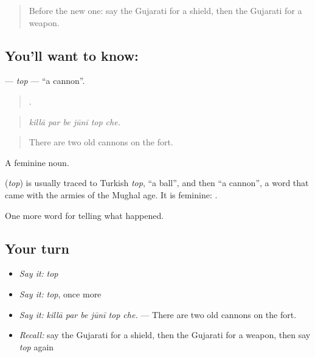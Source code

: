 \label{lesson:GU-C321-top}



\begin{quote}
Before the new one: say the Gujarati for a shield, then the Gujarati for a weapon.
\end{quote}

\subsection*{You'll want to know: }
\textbf{} — \emph{top} — \textquotedblleft{}a cannon\textquotedblright{}.

\begin{quote}
     .
\end{quote}

\begin{quote}
\emph{killā par be jūnī top che.}
\end{quote}

\begin{quote}
There are two old cannons on the fort.
\end{quote}

A feminine noun.

\begin{cousinweb}
\textbf{} (\emph{top}) is usually traced to Turkish \emph{top}, \textquotedblleft{}a ball\textquotedblright{}, and then \textquotedblleft{}a cannon\textquotedblright{}, a word that came with the armies of the Mughal age. It is feminine: \textbf{ }.
\end{cousinweb}

\begin{grammarlens}[title={What you've built}]
One more word for telling what happened.
\end{grammarlens}

\subsection*{Your turn}
\begin{itemize}
\raggedright
  \item \emph{Say it:} \emph{top}
  \item \emph{Say it:} \emph{top}, once more
  \item \emph{Say it:} \emph{killā par be jūnī top che.} — There are two old cannons on the fort.
  \item \emph{Recall:} say the Gujarati for a shield, then the Gujarati for a weapon, then say \emph{top} again
\end{itemize}

